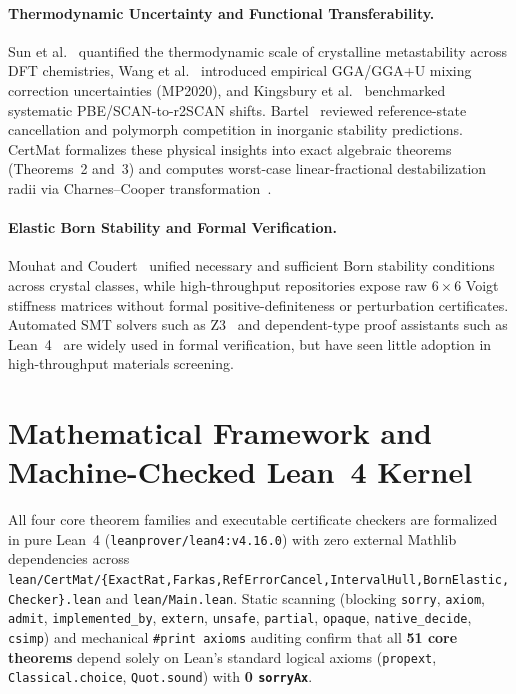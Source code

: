 \documentclass[11pt,a4paper]{article}
\newcommand{\br}{\allowbreak{}}
\begin{document}
\paragraph{Thermodynamic Uncertainty and Functional Transferability.}
Sun et al.~\cite{sun2016metastability} quantified the thermodynamic scale of crystalline metastability across DFT chemistries, Wang et al.~\cite{wang2021mp2020} introduced empirical GGA/GGA+U mixing correction uncertainties (MP2020), and Kingsbury et al.~\cite{kingsbury2022r2scan} benchmarked systematic PBE/SCAN-to-r2SCAN shifts. Bartel~\cite{bartel2022review} reviewed reference-state cancellation and polymorph competition in inorganic stability predictions. CertMat formalizes these physical insights into exact algebraic theorems (Theorems~2 and~3) and computes worst-case linear-fractional destabilization radii via Charnes--Cooper transformation~\cite{charnes1962fractional}.

\paragraph{Elastic Born Stability and Formal Verification.}
Mouhat and Coudert~\cite{mouhat2014born} unified necessary and sufficient Born stability conditions across crystal classes, while high-throughput repositories expose raw $6\times 6$ Voigt stiffness matrices without formal positive-definiteness or perturbation certificates. Automated SMT solvers such as Z3~\cite{demoura2008z3} and dependent-type proof assistants such as Lean~4~\cite{demoura2021lean4} are widely used in formal verification, but have seen little adoption in high-throughput materials screening.

\section{Mathematical Framework and Machine-Checked Lean~4 Kernel}

All four core theorem families and executable certificate checkers are formalized in pure Lean~4 (\texttt{leanprover/lean4:v4.16.0}) with zero external Mathlib dependencies across \texttt{lean/\br{}CertMat/\br{}\{ExactRat,\br{}Farkas,\br{}RefErrorCancel,\br{}IntervalHull,\br{}BornElastic,\br{}Checker\}.lean} and \texttt{lean/\br{}Main.lean}. Static scanning (blocking \texttt{sorry}, \texttt{axiom}, \texttt{admit}, \texttt{implemented\_\br{}by}, \texttt{extern}, \texttt{unsafe}, \texttt{partial}, \texttt{opaque}, \texttt{native\_\br{}decide}, \texttt{csimp}) and mechanical \texttt{\#print axioms} auditing confirm that all \textbf{51 core theorems} depend solely on Lean's standard logical axioms (\texttt{propext}, \texttt{Classical.choice}, \texttt{Quot.sound}) with \textbf{0 \texttt{sorryAx}}.
\end{document}

